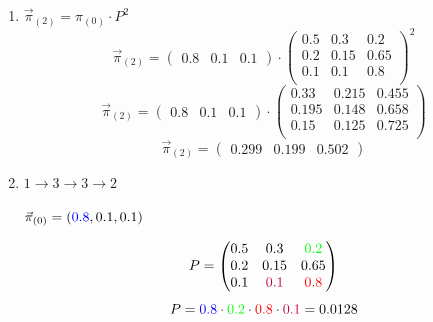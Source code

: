 \documentclass{templateNote}
\begin{document}
\begin{enumerate}[label=\alph*)]
    \item $\vec{\pi}_{(2)}= \pi_{(0)} \cdot P^2 $
    \begin{equation*}
        \vec{\pi}_{(2)}= 
            \begin{pmatrix}
                0.8 & 0.1 & 0.1
            \end{pmatrix} 
            \cdot
            \begin{pmatrix}
                0.5 & 0.3   & 0.2 \\
                0.2 & 0.15  & 0.65 \\
                0.1 & 0.1   & 0.8 \\
            \end{pmatrix}^{2} 
    \end{equation*}
    \begin{equation*}
        \vec{\pi}_{(2)}= 
            \begin{pmatrix}
                0.8 & 0.1 & 0.1
            \end{pmatrix} 
            \cdot
            \begin{pmatrix}
               0.33 & 0.215 & 0.455 \\
               0.195 & 0.148 & 0.658 \\
               0.15 & 0.125 & 0.725 \\
            \end{pmatrix}
    \end{equation*}
    \begin{equation*}
        \vec{\pi}_{(2)}= 
            \begin{pmatrix}
                0.299 & 0.199 & 0.502
            \end{pmatrix}
    \end{equation*}

    \item $1\rightarrow3\rightarrow3\rightarrow2$
    \begin{center}
        $\vec{\pi}_{(0)} = (\textcolor{blue}{0.8},0.1,0.1)$
    \end{center}
    \[
    P = \begin{pmatrix}
        0.5 & 0.3   & \textcolor{green}{0.2} \\
        0.2 & 0.15  & 0.65 \\
        0.1 & \textcolor{purple}{0.1}  & \textcolor{red}{0.8}  \\
    \end{pmatrix}
    \]
    \begin{equation*}
        P= \textcolor{blue}{0.8} \cdot \textcolor{green}{0.2} \cdot \textcolor{red}{0.8} \cdot \textcolor{purple}{0.1} = 0.0128
    \end{equation*}


\end{enumerate}
\end{document}
